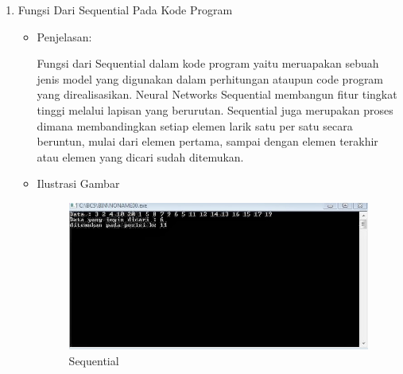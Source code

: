 \begin{enumerate}
\item Fungsi Dari Sequential Pada Kode Program
\begin{itemize}
\item Penjelasan:
\par Fungsi dari Sequential dalam kode program yaitu meruapakan sebuah jenis model yang digunakan dalam perhitungan ataupun code program yang direalisasikan. Neural Networks Sequential membangun fitur tingkat tinggi melalui lapisan yang berurutan. Sequential juga merupakan proses dimana membandingkan setiap elemen larik satu per satu secara beruntun, mulai dari elemen pertama, sampai dengan elemen terakhir atau elemen yang dicari sudah ditemukan.
\item Ilustrasi Gambar
\begin{figure}[!hbtp]
\centering
\includegraphics[scale=0.8]{figures/andi/68.jpg}
\caption{Sequential}
\label{Contoh 8}
\end{figure}
\end{itemize}

\end{enumerate}

